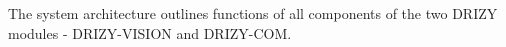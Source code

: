 \section{}
\paragraph{}The system architecture outlines functions of all components of the two DRIZY modules - DRIZY-VISION and DRIZY-COM. 